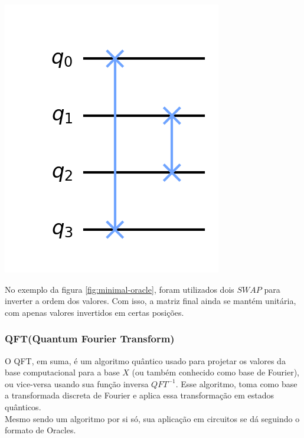 \documentclass{article}
\begin{document}
\begin{center}
	\includegraphics[scale=0.3]{minimal-oracle.png}
	\label{fig:minimal-oracle}
\end{center}

No exemplo da figura \ref{fig:minimal-oracle}, foram utilizados dois $SWAP$ para inverter a ordem dos valores. Com isso, a matriz final ainda se mantém unitária, com apenas valores invertidos em certas posições.


\subsubsection{QFT(Quantum Fourier Transform)}

O QFT, em suma, é um algoritmo quântico usado para projetar os valores da base computacional para a base $X$ (ou também conhecido como base de Fourier), ou vice-versa usando sua função inversa $QFT^{-1}$. Esse algoritmo, toma como base a transformada discreta de Fourier e aplica essa transformação em estados quânticos.\\
Mesmo sendo um algoritmo por si só, sua aplicação em circuitos se dá seguindo o formato de Oracles.
\end{document}
